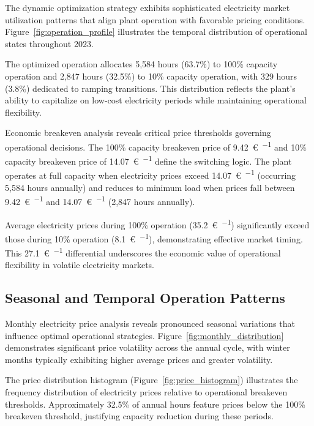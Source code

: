 \documentclass[12pt,a4paper]{article}
\begin{document}
The dynamic optimization strategy exhibits sophisticated electricity market utilization patterns that align plant operation with favorable pricing conditions. Figure~\ref{fig:operation_profile} illustrates the temporal distribution of operational states throughout 2023.


The optimized operation allocates 5,584 hours (63.7\%) to 100\% capacity operation and 2,847 hours (32.5\%) to 10\% capacity operation, with 329 hours (3.8\%) dedicated to ramping transitions. This distribution reflects the plant's ability to capitalize on low-cost electricity periods while maintaining operational flexibility.

Economic breakeven analysis reveals critical price thresholds governing operational decisions. The 100\% capacity breakeven price of \SI{9.42}{\euro\per\MWh} and 10\% capacity breakeven price of \SI{14.07}{\euro\per\MWh} define the switching logic. The plant operates at full capacity when electricity prices exceed \SI{14.07}{\euro\per\MWh} (occurring 5,584 hours annually) and reduces to minimum load when prices fall between \SI{9.42}{\euro\per\MWh} and \SI{14.07}{\euro\per\MWh} (2,847 hours annually).

Average electricity prices during 100\% operation (\SI{35.2}{\euro\per\MWh}) significantly exceed those during 10\% operation (\SI{8.1}{\euro\per\MWh}), demonstrating effective market timing. This \SI{27.1}{\euro\per\MWh} differential underscores the economic value of operational flexibility in volatile electricity markets.

\subsection{Seasonal and Temporal Operation Patterns}

Monthly electricity price analysis reveals pronounced seasonal variations that influence optimal operational strategies. Figure~\ref{fig:monthly_distribution} demonstrates significant price volatility across the annual cycle, with winter months typically exhibiting higher average prices and greater volatility.


The price distribution histogram (Figure~\ref{fig:price_histogram}) illustrates the frequency distribution of electricity prices relative to operational breakeven thresholds. Approximately 32.5\% of annual hours feature prices below the 100\% breakeven threshold, justifying capacity reduction during these periods.
\end{document}
